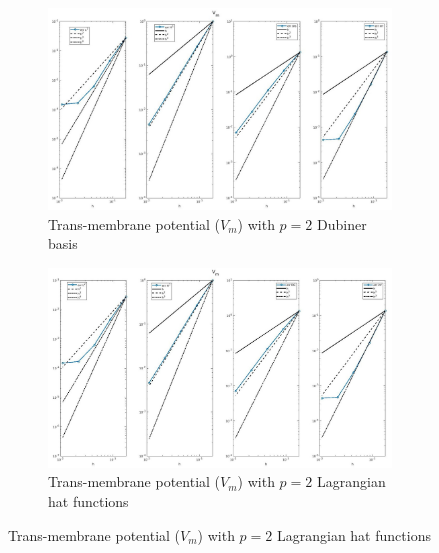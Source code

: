 \documentclass[a4paper,11pt]{article}
\begin{document}
\begin{figure}[H]
\caption{Comparison of the trans-membrane potential ($V_m$)}
\label{Vm_2}
\begin{subfigure}{\textwidth}
\begin{center}
\includegraphics[width = \textwidth]{./D2_Vm_1.jpg}
\caption{Trans-membrane potential ($V_m$) with $p=2$ Dubiner basis}
\end{center}
\end{subfigure}
\begin{subfigure}{\textwidth}
\begin{center}
\includegraphics[width =\textwidth]{./P2_Vm_1.jpg}
\caption{Trans-membrane potential ($V_m$) with $p=2$ Lagrangian hat functions}
\end{center}
\end{subfigure}
\end{figure}
\end{document}
